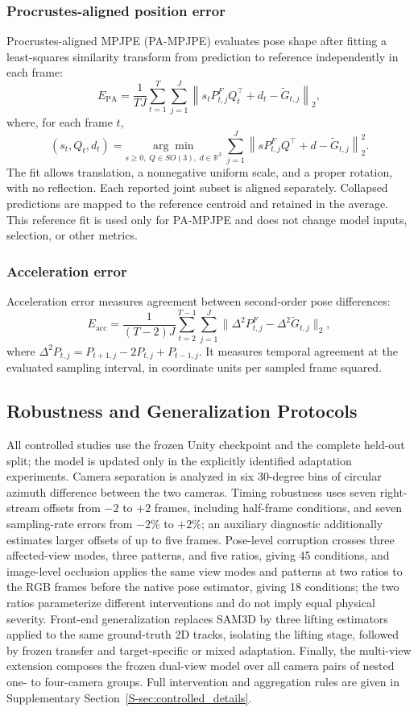 \documentclass[preprint,12pt]{elsarticle}
\begin{document}
\subsubsection{Procrustes-aligned position error}
Procrustes-aligned MPJPE (PA-MPJPE) evaluates pose shape after fitting a least-squares similarity transform from prediction to reference independently in each frame:
\[
E_{\mathrm{PA}}=\frac{1}{TJ}\sum_{t=1}^{T}\sum_{j=1}^{J}\left\|s_t P^F_{t,j}Q_t^{\top}+d_t-\tilde{G}_{t,j}\right\|_2,
\]
where, for each frame \(t\),
\[
(s_t,Q_t,d_t)=\underset{s\geq0,\;Q\in SO(3),\;d\in\mathbb{R}^3}{\arg\min}\;\sum_{j=1}^{J}\left\|sP^F_{t,j}Q^{\top}+d-\tilde{G}_{t,j}\right\|_2^2 .
\]
The fit allows translation, a nonnegative uniform scale, and a proper rotation, with no reflection. Each reported joint subset is aligned separately. Collapsed predictions are mapped to the reference centroid and retained in the average. This reference fit is used only for PA-MPJPE and does not change model inputs, selection, or other metrics.

\subsubsection{Acceleration error}
Acceleration error measures agreement between second-order pose differences:
\[
E_{\mathrm{acc}}=\frac{1}{(T-2)J}\sum_{t=2}^{T-1}\sum_{j=1}^{J}
\|\Delta^2 P^F_{t,j}-\Delta^2\tilde{G}_{t,j}\|_2,
\]
where \(\Delta^2 P_{t,j}=P_{t+1,j}-2P_{t,j}+P_{t-1,j}\). It measures temporal agreement at the evaluated sampling interval, in coordinate units per sampled frame squared.

\subsection{Robustness and Generalization Protocols}
\label{subsec:controlled_protocol}

All controlled studies use the frozen Unity checkpoint and the complete held-out split; the model is updated only in the explicitly identified adaptation experiments. Camera separation is analyzed in six 30-degree bins of circular azimuth difference between the two cameras. Timing robustness uses seven right-stream offsets from \(-2\) to \(+2\) frames, including half-frame conditions, and seven sampling-rate errors from \(-2\%\) to \(+2\%\); an auxiliary diagnostic additionally estimates larger offsets of up to five frames. Pose-level corruption crosses three affected-view modes, three patterns, and five ratios, giving 45 conditions, and image-level occlusion applies the same view modes and patterns at two ratios to the RGB frames before the native pose estimator, giving 18 conditions; the two ratios parameterize different interventions and do not imply equal physical severity. Front-end generalization replaces SAM3D by three lifting estimators applied to the same ground-truth 2D tracks, isolating the lifting stage, followed by frozen transfer and target-specific or mixed adaptation. Finally, the multi-view extension composes the frozen dual-view model over all camera pairs of nested one- to four-camera groups. Full intervention and aggregation rules are given in Supplementary Section~\ref{S-sec:controlled_details}.
\end{document}
